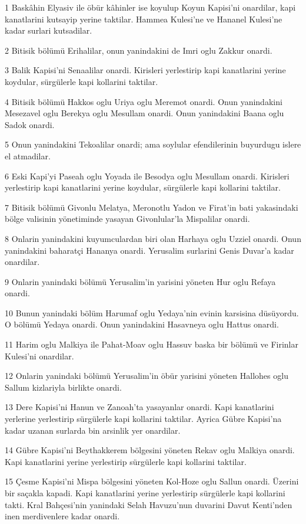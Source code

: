 \par 1 Baskâhin Elyasiv ile öbür kâhinler ise koyulup Koyun Kapisi'ni onardilar, kapi kanatlarini kutsayip yerine taktilar. Hammea Kulesi'ne ve Hananel Kulesi'ne kadar surlari kutsadilar.
\par 2 Bitisik bölümü Erihalilar, onun yanindakini de Imri oglu Zakkur onardi.
\par 3 Balik Kapisi'ni Senaalilar onardi. Kirisleri yerlestirip kapi kanatlarini yerine koydular, sürgülerle kapi kollarini taktilar.
\par 4 Bitisik bölümü Hakkos oglu Uriya oglu Meremot onardi. Onun yanindakini Mesezavel oglu Berekya oglu Mesullam onardi. Onun yanindakini Baana oglu Sadok onardi.
\par 5 Onun yanindakini Tekoalilar onardi; ama soylular efendilerinin buyurdugu islere el atmadilar.
\par 6 Eski Kapi'yi Paseah oglu Yoyada ile Besodya oglu Mesullam onardi. Kirisleri yerlestirip kapi kanatlarini yerine koydular, sürgülerle kapi kollarini taktilar.
\par 7 Bitisik bölümü Givonlu Melatya, Meronotlu Yadon ve Firat'in bati yakasindaki bölge valisinin yönetiminde yasayan Givonlular'la Mispalilar onardi.
\par 8 Onlarin yanindakini kuyumculardan biri olan Harhaya oglu Uzziel onardi. Onun yanindakini baharatçi Hananya onardi. Yerusalim surlarini Genis Duvar'a kadar onardilar.
\par 9 Onlarin yanindaki bölümü Yerusalim'in yarisini yöneten Hur oglu Refaya onardi.
\par 10 Bunun yanindaki bölüm Harumaf oglu Yedaya'nin evinin karsisina düsüyordu. O bölümü Yedaya onardi. Onun yanindakini Hasavneya oglu Hattus onardi.
\par 11 Harim oglu Malkiya ile Pahat-Moav oglu Hassuv baska bir bölümü ve Firinlar Kulesi'ni onardilar.
\par 12 Onlarin yanindaki bölümü Yerusalim'in öbür yarisini yöneten Hallohes oglu Sallum kizlariyla birlikte onardi.
\par 13 Dere Kapisi'ni Hanun ve Zanoah'ta yasayanlar onardi. Kapi kanatlarini yerlerine yerlestirip sürgülerle kapi kollarini taktilar. Ayrica Gübre Kapisi'na kadar uzanan surlarda bin arsinlik yer onardilar.
\par 14 Gübre Kapisi'ni Beythakkerem bölgesini yöneten Rekav oglu Malkiya onardi. Kapi kanatlarini yerine yerlestirip sürgülerle kapi kollarini taktilar.
\par 15 Çesme Kapisi'ni Mispa bölgesini yöneten Kol-Hoze oglu Sallun onardi. Üzerini bir saçakla kapadi. Kapi kanatlarini yerine yerlestirip sürgülerle kapi kollarini takti. Kral Bahçesi'nin yanindaki Selah Havuzu'nun duvarini Davut Kenti'nden inen merdivenlere kadar onardi.
